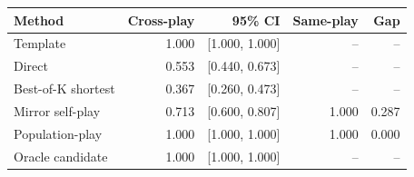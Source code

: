\begin{tabular}{lrrrr}
\toprule
Method & Cross-play & 95\% CI & Same-play & Gap \\
\midrule
Template & 1.000 & [1.000, 1.000] & -- & -- \\
Direct & 0.553 & [0.440, 0.673] & -- & -- \\
Best-of-K shortest & 0.367 & [0.260, 0.473] & -- & -- \\
Mirror self-play & 0.713 & [0.600, 0.807] & 1.000 & 0.287 \\
Population-play & 1.000 & [1.000, 1.000] & 1.000 & 0.000 \\
Oracle candidate & 1.000 & [1.000, 1.000] & -- & -- \\
\bottomrule
\end{tabular}
